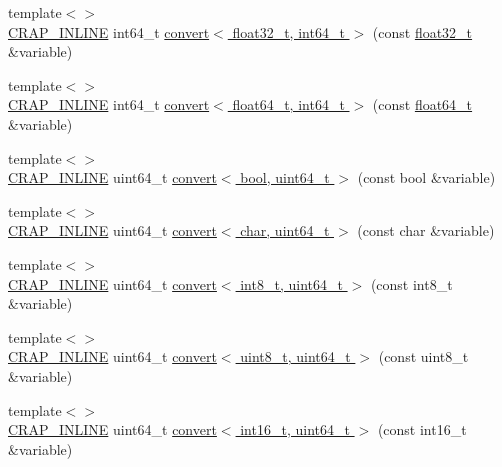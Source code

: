 \begin{DoxyCompactItemize}
\item 
{\footnotesize template$<$$>$ }\\\hyperlink{config__x86_8h_a5a40526b8d842e7ff731509998bb0f1c}{C\+R\+A\+P\+\_\+\+I\+N\+L\+I\+N\+E} int64\+\_\+t \hyperlink{namespacecrap_a3266b6a23484cef532b7ef2b13b301fa}{convert$<$ float32\+\_\+t, int64\+\_\+t $>$} (const \hyperlink{crap__types_8h_a4611b605e45ab401f02cab15c5e38715}{float32\+\_\+t} \&variable)
\item 
{\footnotesize template$<$$>$ }\\\hyperlink{config__x86_8h_a5a40526b8d842e7ff731509998bb0f1c}{C\+R\+A\+P\+\_\+\+I\+N\+L\+I\+N\+E} int64\+\_\+t \hyperlink{namespacecrap_aaffe171bbc19487ed1159c087ee53aae}{convert$<$ float64\+\_\+t, int64\+\_\+t $>$} (const \hyperlink{crap__types_8h_ac55f3ae81b5bc9053760baacf57e47f4}{float64\+\_\+t} \&variable)
\item 
{\footnotesize template$<$$>$ }\\\hyperlink{config__x86_8h_a5a40526b8d842e7ff731509998bb0f1c}{C\+R\+A\+P\+\_\+\+I\+N\+L\+I\+N\+E} uint64\+\_\+t \hyperlink{namespacecrap_ac1984064539fb31244fac30df0bc71b6}{convert$<$ bool, uint64\+\_\+t $>$} (const bool \&variable)
\item 
{\footnotesize template$<$$>$ }\\\hyperlink{config__x86_8h_a5a40526b8d842e7ff731509998bb0f1c}{C\+R\+A\+P\+\_\+\+I\+N\+L\+I\+N\+E} uint64\+\_\+t \hyperlink{namespacecrap_a9a3cbca677db3256e8068fee855d90f6}{convert$<$ char, uint64\+\_\+t $>$} (const char \&variable)
\item 
{\footnotesize template$<$$>$ }\\\hyperlink{config__x86_8h_a5a40526b8d842e7ff731509998bb0f1c}{C\+R\+A\+P\+\_\+\+I\+N\+L\+I\+N\+E} uint64\+\_\+t \hyperlink{namespacecrap_a35c6ad33f99dd81fbf6ef8a7c6632792}{convert$<$ int8\+\_\+t, uint64\+\_\+t $>$} (const int8\+\_\+t \&variable)
\item 
{\footnotesize template$<$$>$ }\\\hyperlink{config__x86_8h_a5a40526b8d842e7ff731509998bb0f1c}{C\+R\+A\+P\+\_\+\+I\+N\+L\+I\+N\+E} uint64\+\_\+t \hyperlink{namespacecrap_aafe112997e6b55d0a78b9ae089161044}{convert$<$ uint8\+\_\+t, uint64\+\_\+t $>$} (const uint8\+\_\+t \&variable)
\item 
{\footnotesize template$<$$>$ }\\\hyperlink{config__x86_8h_a5a40526b8d842e7ff731509998bb0f1c}{C\+R\+A\+P\+\_\+\+I\+N\+L\+I\+N\+E} uint64\+\_\+t \hyperlink{namespacecrap_adafd573c133021e3afea3948484e39f8}{convert$<$ int16\+\_\+t, uint64\+\_\+t $>$} (const int16\+\_\+t \&variable)

\end{DoxyCompactItemize}
